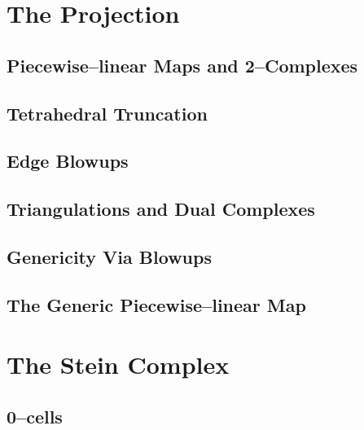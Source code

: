\label{cha:alg1}



\section{The Projection}
\label{sec:proj}


	\subsection{Piecewise--linear Maps and 2--Complexes}
	\label{sub:2complex}
	
	
	\subsection{Tetrahedral Truncation}
	\label{sub:truncttet}
	
	
	\subsection{Edge Blowups}
	\label{sub:edgeblowup}
	
	
	\subsection{Triangulations and Dual Complexes}
	\label{sub:tridual}
	
	
	\subsection{Genericity Via Blowups}
	\label{sub:genericity}
	
	
	\subsection{The Generic Piecewise--linear Map}
	\label{sub:genericplmap}
	

\section{The Stein Complex}
\label{sec:stein}


	\subsection{0--cells}
	\label{sub:zero}
	
	
